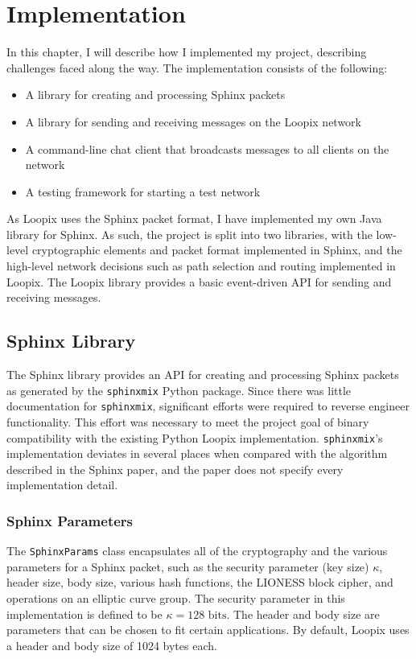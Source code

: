 \documentclass[final,dissertation.tex]{subfiles}
\begin{document}
\chapter{Implementation}

In this chapter, I will describe how I implemented my project, describing challenges faced along the way. The implementation consists of the following:

\begin{itemize}
	\item A library for creating and processing Sphinx packets
	\item A library for sending and receiving messages on the Loopix network
	\item A command-line chat client that broadcasts messages to all clients on the network
	\item A testing framework for starting a test network
\end{itemize}

As Loopix uses the Sphinx packet format, I have implemented my own Java library for Sphinx. As such, the project is split into two libraries, with the low-level cryptographic elements and packet format implemented in Sphinx, and the high-level network decisions such as path selection and routing implemented in Loopix. The Loopix library provides a basic event-driven API for sending and receiving messages.

\section{Sphinx Library}

The Sphinx library provides an API for creating and processing Sphinx packets as generated by the \verb|sphinxmix| Python package. Since there was little documentation for \verb|sphinxmix|, significant efforts were required to reverse engineer functionality. This effort was necessary to meet the project goal of binary compatibility with the existing Python Loopix implementation. \verb|sphinxmix|'s implementation deviates in several places when compared with the algorithm described in the Sphinx paper, and the paper does not specify every implementation detail.

\subsection{Sphinx Parameters}

The \verb|SphinxParams| class encapsulates all of the cryptography and the various parameters for a Sphinx packet, such as the security parameter (key size) $\kappa$, header size, body size, various hash functions, the LIONESS block cipher, and operations on an elliptic curve group. The security parameter in this implementation is defined to be $\kappa = 128\text{ bits}$. The header and body size are parameters that can be chosen to fit certain applications. By default, Loopix uses a header and body size of 1024 bytes each.
\end{document}

